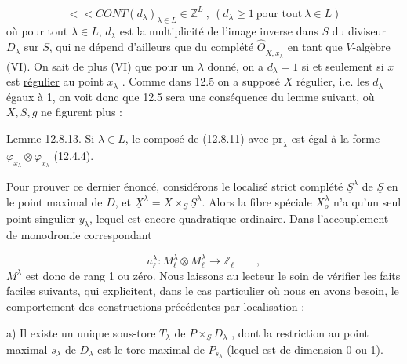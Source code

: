 
\begin{equation}\tag{12.8.12}
<<CONT (d_\lambda)_{\lambda \in L} \in \mathbb{Z}^L \ , \ (d_\lambda \geqslant 1 \ \mbox{pour tout} \ \lambda \in L)
\end{equation}
où pour tout $\lambda \in L$, $d_\lambda$ est la multiplicité de l'image inverse dans $S$ du diviseur $D_\lambda$ sur $\underline{S}$, qui ne dépend d'ailleurs que du complété $\widehat{\underline{O}}_{X,x_\lambda}$ en tant que $V$-algèbre (VI\hspace{2.5em}). On sait de plus (VI\hspace{2.5em}) que pour un $\lambda$ donné, on a $d_\lambda = 1$ si et seulement si $x$ est \underline{régulier} au point $x_\lambda$ . Comme dans 12.5 on a supposé $X$ régulier, i.e. les $d_\lambda$ égaux à 1, on voit donc que 12.5 sera une conséquence du lemme suivant, où $X,S,g$ ne figurent plus :

\underline{Lemme} 12.8.13. \underline{Si} $\lambda \in L$, \underline{le composé de} (12.8.11) \underline{avec} $\mathrm{pr}_\lambda$ \underline{est égal à la forme} $\varphi_{x_\lambda} \otimes \varphi_{x_\lambda}$ (12.4.4).

Pour prouver ce dernier énoncé, considérons le localisé strict complété $\underline{S}^\lambda$ de $\underline{S}$ en le point maximal de $D$, et $\underline{X}^\lambda = X \times_{\underline{S}} \underline{S}^\lambda$. Alors la fibre spéciale $X_o^\lambda$ n'a qu'un seul point singulier $y_\lambda$, lequel est encore quadratique ordinaire. Dans l'accouplement de monodromie correspondant

\begin{equation}\tag{12.8.14}
u_\ell^\lambda : M_\ell^\lambda \otimes M_\ell^\lambda \longrightarrow \mathbb{Z}_\ell \qquad ,
\end{equation}
$M^\lambda$ est donc de rang 1 ou zéro. Nous laissons au lecteur le soin de vérifier les faits faciles suivants, qui explicitent, dans le cas particulier où nous en avons besoin, le comportement des constructions précédentes par localisation :

a) Il existe un unique sous-tore $T_\lambda$ de $P \times_{\underline{S}} D_\lambda$ , dont la restriction au point maximal $s_\lambda$ de $D_\lambda$ est le tore maximal de $P_{s_\lambda}$ (lequel est de dimension 0 ou 1).



